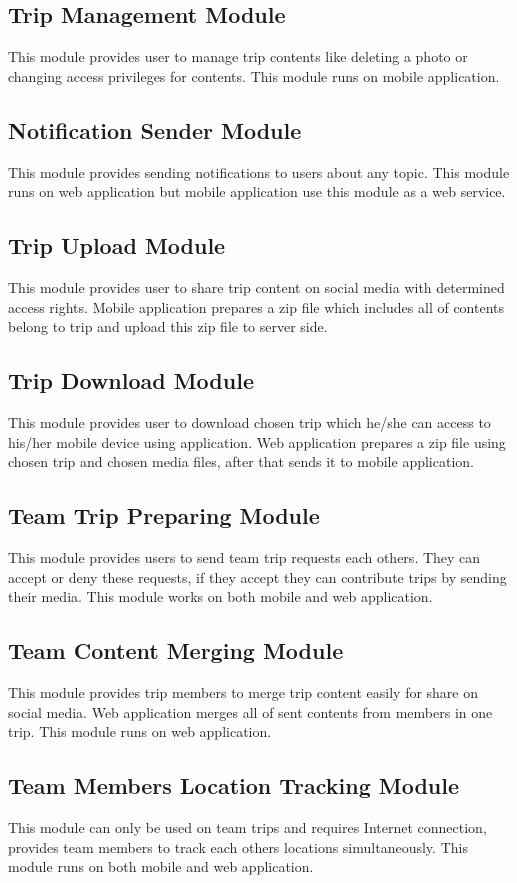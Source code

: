 \subsection{Trip Management Module}
This module provides user to manage trip contents like deleting a photo or changing access privileges for contents. This module runs on mobile application.
\subsection{Notification Sender Module}   
This module provides sending notifications to users about any topic. This module runs on web application but mobile application use this module as a web service.
\subsection{Trip Upload Module}
This module provides user to share trip content on social media with determined access rights. Mobile application prepares a zip file which includes all of contents belong to trip and upload this zip file to server side.
\subsection{Trip Download Module}
This module provides user to download chosen trip  which he/she can access to his/her mobile device using application. Web application prepares a zip file using chosen trip and chosen media files, after that sends it to mobile application.
\subsection{Team Trip Preparing Module}
This module provides users to send team trip requests each others. They can accept or deny these requests, if they accept they can contribute trips by sending their media. This module works on both mobile and web application.

\subsection{Team Content Merging Module}
This module provides trip members to merge trip content easily for share on social media. Web application merges all of sent contents from members in one trip. This module runs on web application.

\subsection{Team Members Location Tracking Module}
This module can only be used on team trips and requires Internet connection, provides team members to track each others locations simultaneously. This module runs on both mobile  and web application.
   
